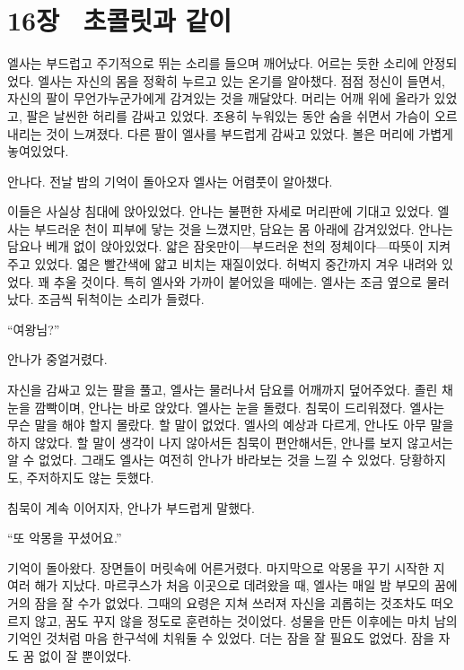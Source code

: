 

\chapter[16장  초콜릿과 같이][16장\hspace*{.5em}초콜릿과 같이]{16장 \ 초콜릿과 같이}



엘사는 부드럽고 주기적으로 뛰는 소리를 들으며 깨어났다. 어르는 듯한 소리에 안정되었다. 엘사는 자신의 몸을 정확히 누르고 있는 온기를 알아챘다. 점점 정신이 들면서, 자신의 팔이 무언가 누군가에게 감겨있는 것을 깨달았다. 머리는 어깨 위에 올라가 있었고, 팔은 날씬한 허리를 감싸고 있었다. 조용히 누워있는 동안 숨을 쉬면서 가슴이 오르내리는 것이 느껴졌다. 다른 팔이 엘사를 부드럽게 감싸고 있었다. 볼은 머리에 가볍게 놓여있었다.

안나다. 전날 밤의 기억이 돌아오자 엘사는 어렴풋이 알아챘다.

이들은 사실상 침대에 앉아있었다. 안나는 불편한 자세로 머리판에 기대고 있었다. 엘사는 부드러운 천이 피부에 닿는 것을 느꼈지만, 담요는 몸 아래에 감겨있었다. 안나는 담요나 베개 없이 앉아있었다. 얇은 잠옷만이—부드러운 천의 정체이다—따뜻이 지켜주고 있었다. 엷은 빨간색에 얇고 비치는 재질이었다. 허벅지 중간까지 겨우 내려와 있었다. 꽤 추울 것이다. 특히 엘사와 가까이 붙어있을 때에는. 엘사는 조금 옆으로 물러났다. 조금씩 뒤척이는 소리가 들렸다.

``여왕님?''

안나가 중얼거렸다.

자신을 감싸고 있는 팔을 풀고, 엘사는 물러나서 담요를 어깨까지 덮어주었다. 졸린 채 눈을 깜빡이며, 안나는 바로 앉았다. 엘사는 눈을 돌렸다. 침묵이 드리워졌다. 엘사는 무슨 말을 해야 할지 몰랐다. 할 말이 없었다. 엘사의 예상과 다르게, 안나도 아무 말을 하지 않았다. 할 말이 생각이 나지 않아서든 침묵이 편안해서든, 안나를 보지 않고서는 알 수 없었다. 그래도 엘사는 여전히 안나가 바라보는 것을 느낄 수 있었다. 당황하지도, 주저하지도 않는 듯했다.

침묵이 계속 이어지자, 안나가 부드럽게 말했다.

``또 악몽을 꾸셨어요.''

기억이 돌아왔다. 장면들이 머릿속에 어른거렸다. 마지막으로 악몽을 꾸기 시작한 지 여러 해가 지났다. 마르쿠스가 처음 이곳으로 데려왔을 때, 엘사는 매일 밤 부모의 꿈에 거의 잠을 잘 수가 없었다. 그때의 요령은 지쳐 쓰러져 자신을 괴롭히는 것조차도 떠오르지 않고, 꿈도 꾸지 않을 정도로 훈련하는 것이었다. 성물을 만든 이후에는 마치 남의 기억인 것처럼 마음 한구석에 치워둘 수 있었다. 더는 잠을 잘 필요도 없었다. 잠을 자도 꿈 없이 잘 뿐이었다.

